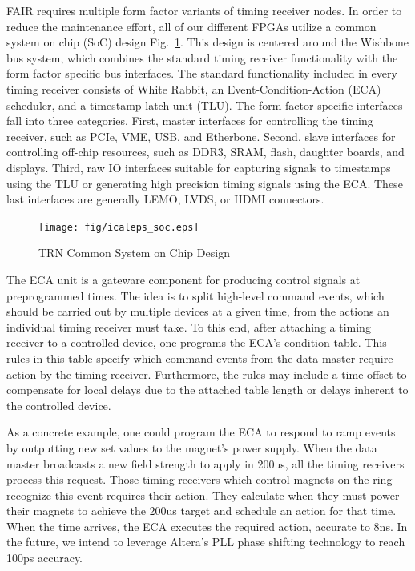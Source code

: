 FAIR requires multiple form factor variants of timing receiver nodes.
In order to reduce the maintenance effort,
all of our different FPGAs utilize a common system on chip (SoC)
design Fig.~\ref{soc}.
This design is centered around the Wishbone bus system,
which combines the standard timing receiver functionality with 
the form factor specific bus interfaces.
The standard functionality included in every timing receiver
consists of White Rabbit, an Event-Condition-Action (ECA) scheduler,
and a timestamp latch unit (TLU).
The form factor specific interfaces fall into three categories.
First, master interfaces for controlling the timing receiver,
such as PCIe, VME, USB, and Etherbone.
Second, slave interfaces for controlling off-chip resources,
such as DDR3, SRAM, flash, daughter boards, and displays.
Third, raw IO interfaces suitable for capturing signals to 
timestamps using the TLU or generating high precision timing
signals using the ECA.
These last interfaces are generally LEMO, LVDS, or HDMI connectors.

\begin{figure}[htb]
   \centering
   \texttt{[image: fig/icaleps\_soc.eps]}
   \caption{TRN Common System on Chip Design}
   \label{soc}
\end{figure}


The ECA unit is a gateware component for producing control
signals at preprogrammed times.
The idea is to split high-level command events,
which should be carried out by multiple devices at a given time,
from the actions an individual timing receiver must take.
To this end, 
after attaching a timing receiver to a controlled device,
one programs the ECA's condition table.
This rules in this table 
specify which command events from the data master
require action by the timing receiver.
Furthermore, the rules may include a time offset to compensate 
for local delays due to the attached table length or delays
inherent to the controlled device.

As a concrete example, 
one could program the ECA to respond to ramp events
by outputting new set values to the magnet's power supply.
When the data master broadcasts a new field strength to apply in 200us,
all the timing receivers process this request.
Those timing receivers which control magnets on the ring
recognize this event requires their action.
They calculate when they must power their magnets to achieve
the 200us target and schedule an action for that time.
When the time arrives, the ECA executes the required action,
accurate to 8ns.
In the future,
we intend to leverage Altera's PLL phase shifting technology 
to reach 100ps accuracy.

